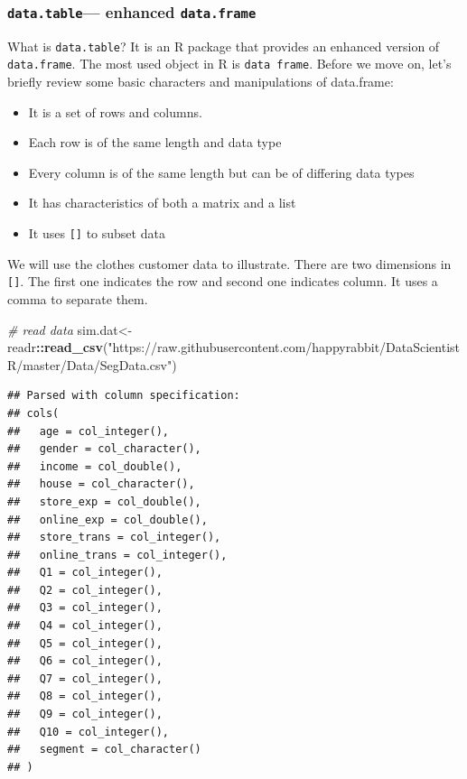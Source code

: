 \documentclass[12pt,]{krantz}
\newenvironment{Shaded}{\begin{snugshade}}{\end{snugshade}}
\newcommand{\KeywordTok}[1]{\textcolor[rgb]{0.13,0.29,0.53}{\textbf{#1}}}
\newcommand{\StringTok}[1]{\textcolor[rgb]{0.31,0.60,0.02}{#1}}
\newcommand{\CommentTok}[1]{\textcolor[rgb]{0.56,0.35,0.01}{\textit{#1}}}
\newcommand{\OperatorTok}[1]{\textcolor[rgb]{0.81,0.36,0.00}{\textbf{#1}}}
\newcommand{\NormalTok}[1]{#1}
\providecommand{\tightlist}{%
  \setlength{\itemsep}{0pt}\setlength{\parskip}{0pt}}
\theoremstyle{definition}
\theoremstyle{definition}
\theoremstyle{definition}
\theoremstyle{remark}
\begin{document}
\subsubsection{\texorpdfstring{\texttt{data.table}--- enhanced
\texttt{data.frame}}{data.table--- enhanced data.frame}}\label{data.table-enhanced-data.frame}

What is \texttt{data.table}? It is an R package that provides an
enhanced version of \texttt{data.frame}. The most used object in R is
\texttt{data\ frame}. Before we move on, let's briefly review some basic
characters and manipulations of data.frame:

\begin{itemize}
\tightlist
\item
  It is a set of rows and columns.
\item
  Each row is of the same length and data type
\item
  Every column is of the same length but can be of differing data types
\item
  It has characteristics of both a matrix and a list
\item
  It uses \texttt{{[}{]}} to subset data
\end{itemize}

We will use the clothes customer data to illustrate. There are two
dimensions in \texttt{{[}{]}}. The first one indicates the row and
second one indicates column. It uses a comma to separate them.

\begin{Shaded}
\begin{Highlighting}[]
\CommentTok{# read data}
\NormalTok{sim.dat<-readr}\OperatorTok{::}\KeywordTok{read_csv}\NormalTok{(}\StringTok{"https://raw.githubusercontent.com/happyrabbit/DataScientistR/master/Data/SegData.csv"}\NormalTok{)}
\end{Highlighting}
\end{Shaded}

\begin{verbatim}
## Parsed with column specification:
## cols(
##   age = col_integer(),
##   gender = col_character(),
##   income = col_double(),
##   house = col_character(),
##   store_exp = col_double(),
##   online_exp = col_double(),
##   store_trans = col_integer(),
##   online_trans = col_integer(),
##   Q1 = col_integer(),
##   Q2 = col_integer(),
##   Q3 = col_integer(),
##   Q4 = col_integer(),
##   Q5 = col_integer(),
##   Q6 = col_integer(),
##   Q7 = col_integer(),
##   Q8 = col_integer(),
##   Q9 = col_integer(),
##   Q10 = col_integer(),
##   segment = col_character()
## )
\end{verbatim}
\end{document}
